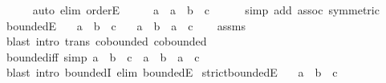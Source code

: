 \begin{isabellebody}
\ \ \ \ \isamarkupfalse%
\ {\isacharparenleft}{\kern0pt}auto\ elim{\isacharbang}{\kern0pt}{\isacharcolon}{\kern0pt}\ orderE{\isacharparenright}{\kern0pt}\isanewline
\ \ \isamarkupfalse%
\ \isamarkupfalse%
\ {\isachardoublequoteopen}a\ {\isacharequal}{\kern0pt}\ a\ \isactrlbold {\isacharasterisk}{\kern0pt}\ {\isacharparenleft}{\kern0pt}b\ \isactrlbold {\isacharasterisk}{\kern0pt}\ c{\isacharparenright}{\kern0pt}{\isachardoublequoteclose}\isanewline
\ \ \ \ \isamarkupfalse%
\ {\isacharparenleft}{\kern0pt}simp\ add{\isacharcolon}{\kern0pt}\ assoc\ {\isacharbrackleft}{\kern0pt}symmetric{\isacharbrackright}{\kern0pt}{\isacharparenright}{\kern0pt}\isanewline
{}\isamarkupfalse%
%
\endisatagproof
{\isafoldproof}%
%
\isadelimproof
\isanewline
%
\endisadelimproof
\isanewline
{}\isamarkupfalse%
\ boundedE{\isacharcolon}{\kern0pt}\isanewline
\ \ \ {\isachardoublequoteopen}a\ \isactrlbold {\isasymle}\ b\ \isactrlbold {\isacharasterisk}{\kern0pt}\ c{\isachardoublequoteclose}\isanewline
\ \ \ {\isachardoublequoteopen}a\ \isactrlbold {\isasymle}\ b{\isachardoublequoteclose}\ \ {\isachardoublequoteopen}a\ \isactrlbold {\isasymle}\ c{\isachardoublequoteclose}\isanewline
%
\isadelimproof
\ \ %
\endisadelimproof
%
\isatagproof
{}\isamarkupfalse%
\ assms\ \isamarkupfalse%
\ {\isacharparenleft}{\kern0pt}blast\ intro{\isacharcolon}{\kern0pt}\ trans\ cobounded{}\ cobounded{}{\isacharparenright}{\kern0pt}%
\endisatagproof
{\isafoldproof}%
%
\isadelimproof
\isanewline
%
\endisadelimproof
\isanewline
{}\isamarkupfalse%
\ bounded{\isacharunderscore}{\kern0pt}iff\ {\isacharbrackleft}{\kern0pt}simp{\isacharbrackright}{\kern0pt}{\isacharcolon}{\kern0pt}\ {\isachardoublequoteopen}a\ \isactrlbold {\isasymle}\ b\ \isactrlbold {\isacharasterisk}{\kern0pt}\ c\ {\isasymlongleftrightarrow}\ a\ \isactrlbold {\isasymle}\ b\ {\isasymand}\ a\ \isactrlbold {\isasymle}\ c{\isachardoublequoteclose}\isanewline
%
\isadelimproof
\ \ %
\endisadelimproof
%
\isatagproof
{}\isamarkupfalse%
\ {\isacharparenleft}{\kern0pt}blast\ intro{\isacharcolon}{\kern0pt}\ boundedI\ elim{\isacharcolon}{\kern0pt}\ boundedE{\isacharparenright}{\kern0pt}%
\endisatagproof
{\isafoldproof}%
%
\isadelimproof
\isanewline
%
\endisadelimproof
\isanewline
{}\isamarkupfalse%
\ strict{\isacharunderscore}{\kern0pt}boundedE{\isacharcolon}{\kern0pt}\isanewline
\ \ \ {\isachardoublequoteopen}a\ \isactrlbold {\isacharless}{\kern0pt}\ b\ \isactrlbold {\isacharasterisk}{\kern0pt}\ c{\isachardoublequoteclose}\isanewline

\end{isabellebody}
